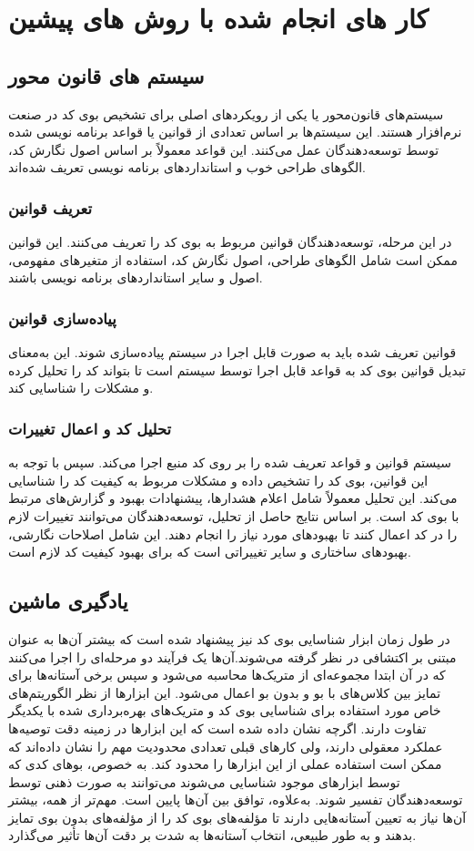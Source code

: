 \clearpage
\section[کار های انجام شده با روش های پیشین]{کار های انجام شده با روش های پیشین}
\subsection{سیستم های قانون محور}
سیستم‌های قانون‌محور یا  یکی از رویکردهای اصلی برای تشخیص بوی کد در صنعت نرم‌افزار هستند. این سیستم‌ها بر اساس تعدادی از قوانین یا قواعد برنامه نویسی شده توسط توسعه‌دهندگان عمل می‌کنند. این قواعد معمولاً بر اساس اصول نگارش کد، الگوهای طراحی خوب و استانداردهای برنامه نویسی تعریف شده‌اند.\cite{ruleBased}
\subsubsection{تعریف قوانین}
در این مرحله، توسعه‌دهندگان قوانین مربوط به بوی کد را تعریف می‌کنند. این قوانین ممکن است شامل الگوهای طراحی، اصول نگارش کد، استفاده از متغیرهای مفهومی، اصول  و سایر استانداردهای برنامه نویسی باشند.
\subsubsection{پیاده‌سازی قوانین}
قوانین تعریف شده باید به صورت قابل اجرا در سیستم پیاده‌سازی شوند. این به‌معنای تبدیل قوانین بوی کد به قواعد قابل اجرا توسط سیستم است تا بتواند کد را تحلیل کرده و مشکلات را شناسایی کند.
\subsubsection{تحلیل کد و اعمال تغییرات}
سیستم قوانین و قواعد تعریف شده را بر روی کد منبع اجرا می‌کند. سپس با توجه به این قوانین، بوی کد را تشخیص داده و مشکلات مربوط به کیفیت کد را شناسایی می‌کند. این تحلیل معمولاً شامل اعلام هشدارها، پیشنهادات بهبود و گزارش‌های مرتبط با بوی کد است.
بر اساس نتایج حاصل از تحلیل، توسعه‌دهندگان می‌توانند تغییرات لازم را در کد اعمال کنند تا بهبودهای مورد نیاز را انجام دهند. این شامل اصلاحات نگارشی، بهبودهای ساختاری و سایر تغییراتی است که برای بهبود کیفیت کد لازم است.
\subsection{یادگیری ماشین}
در طول زمان ابزار شناسایی بوی کد نیز پیشنهاد شده است که بیشتر آن‌ها به عنوان مبتنی بر اکتشافی در نظر گرفته می‌شوند.آن‌ها یک فرآیند دو مرحله‌ای را اجرا می‌کنند که در آن ابتدا مجموعه‌ای از متریک‌ها محاسبه می‌شود و سپس برخی آستانه‌ها برای تمایز بین کلاس‌های با بو و بدون بو اعمال می‌شود. این ابزارها از نظر الگوریتم‌های خاص مورد استفاده برای شناسایی بوی کد و متریک‌های بهره‌برداری شده با یکدیگر تفاوت دارند. اگرچه نشان داده شده است که این ابزارها در زمینه دقت توصیه‌ها عملکرد معقولی دارند، ولی کارهای قبلی تعدادی محدودیت مهم را نشان داده‌اند که ممکن است استفاده عملی از این ابزارها را محدود کند. به خصوص، بوهای کدی که توسط ابزارهای موجود شناسایی می‌شوند می‌توانند به صورت ذهنی توسط توسعه‌دهندگان تفسیر شوند. به‌علاوه، توافق بین آن‌ها پایین است. مهم‌تر از همه، بیشتر آن‌ها نیاز به تعیین آستانه‌هایی دارند تا مؤلفه‌های بوی کد را از مؤلفه‌های بدون بوی تمایز بدهند و به طور طبیعی، انتخاب آستانه‌ها به شدت بر دقت آن‌ها تأثیر می‌گذارد.

